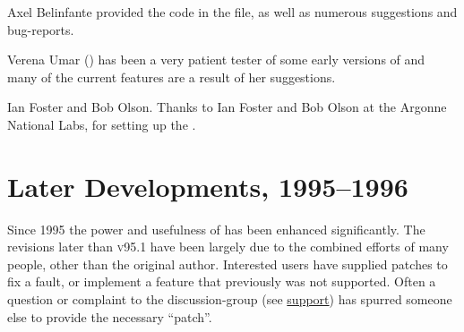 \begin{htmllist}
\item [Axel Belinfante]  
provided the \Perl{} code in the  file, 
as well as numerous suggestions and bug-reports. 

\item 
[Verena Umar]  (\CSEP) 
has been a very patient tester of some early versions of \latextohtml{}
and many of the current features are a result of her suggestions. 

%

\item [Ian Foster and Bob Olson.]
Thanks to Ian Foster  
and Bob Olson 
at the Argonne National Labs, for setting up the \maillist.
\end{htmllist}


\clearpage
\section*{Later Developments, 1995--1996\label{recent96}}%
%
Since 1995 the power and usefulness of \latextohtml{} has been enhanced significantly.
The revisions later than \textsc{v95.1} have been largely due 
to the combined efforts of many people, other than the original author.
Interested users have supplied patches to fix a fault, 
or implement a feature that previously was not supported. 
Often a question or complaint to the discussion-group 
(see \hyperref{Getting Support ...}{Section~}{}{support})
has spurred someone else to provide the necessary ``patch''.%

